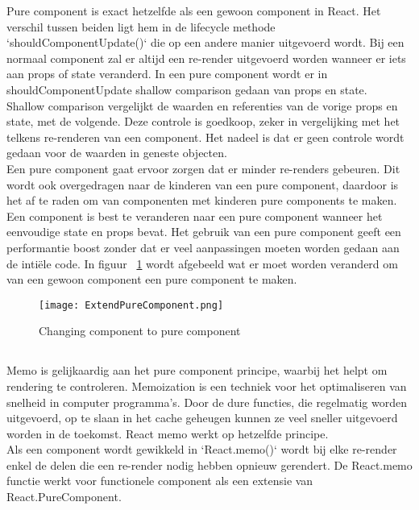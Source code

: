 Pure component is exact hetzelfde als een gewoon component in React. Het verschil tussen beiden ligt hem in de lifecycle methode `shouldComponentUpdate()` die op een andere manier uitgevoerd wordt. Bij een normaal component zal er altijd een re-render uitgevoerd worden wanneer er iets aan props of state veranderd. In een pure component wordt er in shouldComponentUpdate shallow comparison gedaan van props en state.\\
Shallow comparison vergelijkt de waarden en referenties van de vorige props en state, met de volgende. Deze controle is goedkoop, zeker in vergelijking met het telkens re-renderen van een component. Het nadeel is dat er geen controle wordt gedaan voor de waarden in geneste objecten.\\
Een pure component gaat ervoor zorgen dat er minder re-renders gebeuren. Dit wordt ook overgedragen naar de kinderen van een pure component, daardoor is het af te raden om van componenten met kinderen pure components te maken.\\
\newline
Een component is best te veranderen naar een pure component wanneer het eenvoudige state en props bevat. Het gebruik van een pure component geeft een performantie boost zonder dat er veel aanpassingen moeten worden gedaan aan de intiële code. In figuur ~\ref{fig:extendPureComponent} wordt afgebeeld wat er moet worden veranderd om van een gewoon component een pure component te maken.

\begin{figure}[H]
    \texttt{[image: ExtendPureComponent.png]}
    \caption{Changing component to pure component}
    \label{fig:extendPureComponent}
\end{figure}

\subsection{}
\label{sec:memo}

Memo is gelijkaardig aan het pure component principe, waarbij het helpt om rendering te controleren. Memoization is een techniek voor het optimaliseren van snelheid in computer programma's. Door de dure functies, die regelmatig worden uitgevoerd, op te slaan in het cache geheugen kunnen ze veel sneller uitgevoerd worden in de toekomst. React memo werkt op hetzelfde principe.\\
Als een component wordt gewikkeld in `React.memo()` wordt bij elke re-render enkel de delen die een re-render nodig hebben opnieuw gerendert. De React.memo functie werkt voor functionele component als een extensie van React.PureComponent.


